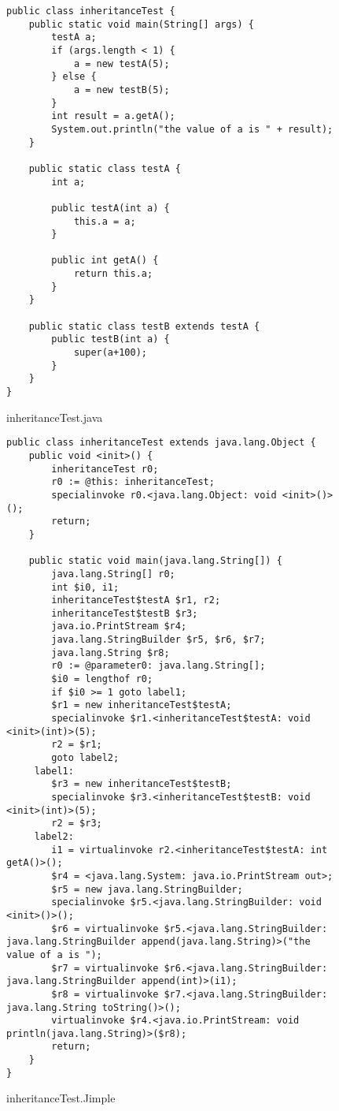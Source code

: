 \documentclass{dithesis}
\begin{document}
            \begin{figure}[H]
\begin{lstlisting}
public class inheritanceTest {
    public static void main(String[] args) {
        testA a;
        if (args.length < 1) {
            a = new testA(5);
        } else {
            a = new testB(5);
        }
        int result = a.getA();
        System.out.println("the value of a is " + result);
    }

    public static class testA {
        int a;

        public testA(int a) {
            this.a = a;
        }

        public int getA() {
            return this.a;
        }
    }

    public static class testB extends testA {
        public testB(int a) {
            super(a+100);
        }
    }
}
\end{lstlisting}
            \caption{inheritanceTest.java}
            \end{figure}
            \begin{figure}[H]
\begin{lstlisting}
public class inheritanceTest extends java.lang.Object {
    public void <init>() {
        inheritanceTest r0;
        r0 := @this: inheritanceTest;
        specialinvoke r0.<java.lang.Object: void <init>()>();
        return;
    }

    public static void main(java.lang.String[]) {
        java.lang.String[] r0;
        int $i0, i1;
        inheritanceTest$testA $r1, r2;
        inheritanceTest$testB $r3;
        java.io.PrintStream $r4;
        java.lang.StringBuilder $r5, $r6, $r7;
        java.lang.String $r8;
        r0 := @parameter0: java.lang.String[];
        $i0 = lengthof r0;
        if $i0 >= 1 goto label1;
        $r1 = new inheritanceTest$testA;
        specialinvoke $r1.<inheritanceTest$testA: void <init>(int)>(5);
        r2 = $r1;
        goto label2;
     label1:
        $r3 = new inheritanceTest$testB;
        specialinvoke $r3.<inheritanceTest$testB: void <init>(int)>(5);
        r2 = $r3;
     label2:
        i1 = virtualinvoke r2.<inheritanceTest$testA: int getA()>();
        $r4 = <java.lang.System: java.io.PrintStream out>;
        $r5 = new java.lang.StringBuilder;
        specialinvoke $r5.<java.lang.StringBuilder: void <init>()>();
        $r6 = virtualinvoke $r5.<java.lang.StringBuilder: java.lang.StringBuilder append(java.lang.String)>("the value of a is ");
        $r7 = virtualinvoke $r6.<java.lang.StringBuilder: java.lang.StringBuilder append(int)>(i1);
        $r8 = virtualinvoke $r7.<java.lang.StringBuilder: java.lang.String toString()>();
        virtualinvoke $r4.<java.io.PrintStream: void println(java.lang.String)>($r8);
        return;
    }
}
\end{lstlisting}
            \caption{inheritanceTest.Jimple}
            \end{figure}
\end{document}
